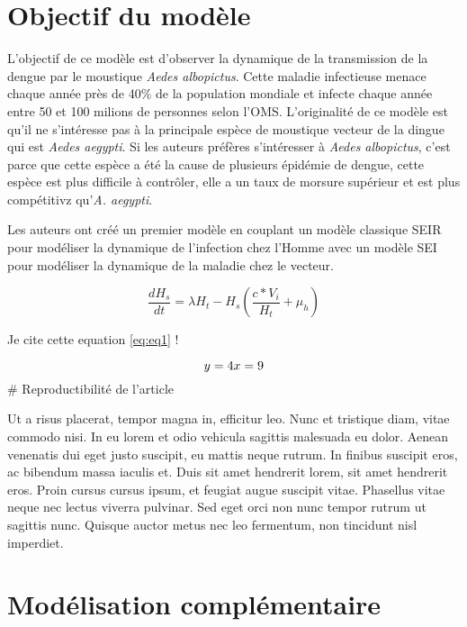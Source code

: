 \hypertarget{objectif-du-moduxe8le}{%
\section{Objectif du modèle}\label{objectif-du-moduxe8le}}

L'objectif de ce modèle est d'observer la dynamique de la transmission
de la dengue par le moustique \emph{Aedes albopictus}. Cette maladie
infectieuse menace chaque année près de 40\% de la population mondiale
et infecte chaque année entre 50 et 100 milions de personnes selon
l'OMS. L'originalité de ce modèle est qu'il ne s'intéresse pas à la
principale espèce de moustique vecteur de la dingue qui est \emph{Aedes
aegypti}. Si les auteurs préfères s'intéresser à \emph{Aedes
albopictus}, c'est parce que cette espèce a été la cause de plusieurs
épidémie de dengue, cette espèce est plus difficile à contrôler, elle a
un taux de morsure supérieur et est plus compétitivz qu'\emph{A.
aegypti}.

Les auteurs ont créé un premier modèle en couplant un modèle classique
SEIR pour modéliser la dynamique de l'infection chez l'Homme avec un
modèle SEI pour modéliser la dynamique de la maladie chez le vecteur.

\begin{equation} \frac{dH_s}{dt} = \lambda H_t - H_s \left(\frac{c*V_i}{H_t} + \mu_h\right)\label{eq:eq1}\end{equation}

Je cite cette equation \ref{eq:eq1} !

\[
y  = 4\\
x  = 9
\] \# Reproductibilité de l'article

Ut a risus placerat, tempor magna in, efficitur leo. Nunc et tristique
diam, vitae commodo nisi. In eu lorem et odio vehicula sagittis
malesuada eu dolor. Aenean venenatis dui eget justo suscipit, eu mattis
neque rutrum. In finibus suscipit eros, ac bibendum massa iaculis et.
Duis sit amet hendrerit lorem, sit amet hendrerit eros. Proin cursus
cursus ipsum, et feugiat augue suscipit vitae. Phasellus vitae neque nec
lectus viverra pulvinar. Sed eget orci non nunc tempor rutrum ut
sagittis nunc. Quisque auctor metus nec leo fermentum, non tincidunt
nisl imperdiet.

\hypertarget{moduxe9lisation-compluxe9mentaire}{%
\section{Modélisation
complémentaire}\label{moduxe9lisation-compluxe9mentaire}}

